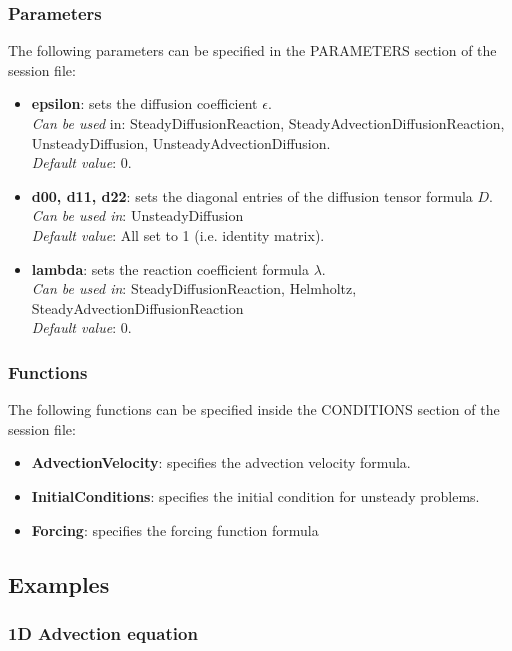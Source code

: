 \subsubsection{Parameters}

The following parameters can be specified in the PARAMETERS section of the session file:
\begin{itemize}
\item \textbf{epsilon}: sets the diffusion coefficient $\epsilon$.\\ 
\textit{Can be used} in: SteadyDiffusionReaction, SteadyAdvectionDiffusionReaction, UnsteadyDiffusion, UnsteadyAdvectionDiffusion. \\
\textit{Default value}: 0.
\item  \textbf{d00, d11, d22}: sets the diagonal entries of the diffusion tensor formula $D$. \\
\textit{Can be used in}: UnsteadyDiffusion \\
\textit{Default value}: All set to 1 (i.e. identity matrix). 
\item  \textbf{lambda}: sets the reaction coefficient formula $\lambda$. \\
\textit{Can be used in}: SteadyDiffusionReaction, Helmholtz, SteadyAdvectionDiffusionReaction\\
\textit{Default value}: 0.
\end{itemize}

\subsubsection{Functions}

The following functions can be specified inside the CONDITIONS section of the session file:

\begin{itemize}
\item \textbf{AdvectionVelocity}: specifies the advection velocity formula.
\item \textbf{InitialConditions}: specifies the initial condition for unsteady problems.
\item \textbf{Forcing}: specifies the forcing function formula
\end{itemize}

\subsection{Examples}
\subsubsection{1D Advection equation}

